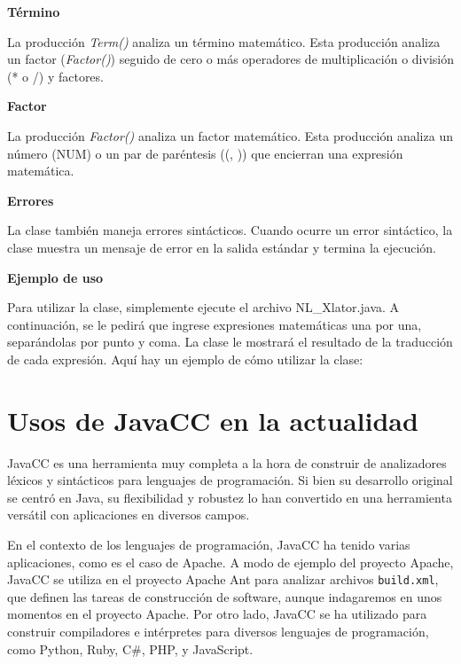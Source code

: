 \phantom{text}

\noindent \textbf{Término}

\phantom{text}

\noindent La producción \textit{Term()} analiza un término matemático. Esta producción analiza un factor (\textit{Factor()}) seguido de cero o más operadores de multiplicación o división (* o /) y factores.

\phantom{text}

\noindent \textbf{Factor}

\phantom{text}

\noindent La producción \textit{Factor()} analiza un factor matemático. Esta producción analiza un número (NUM) o un par de paréntesis ((, )) que encierran una expresión matemática.

\phantom{text}

\noindent \textbf{Errores}

\phantom{text}

\noindent La clase también maneja errores sintácticos. Cuando ocurre un error sintáctico, la clase muestra un mensaje de error en la salida estándar y termina la ejecución.

\phantom{text}

\noindent \textbf{Ejemplo de uso}

\phantom{text}

\noindent Para utilizar la clase, simplemente ejecute el archivo NL\_Xlator.java. A continuación, se le pedirá que ingrese expresiones matemáticas una por una, separándolas por punto y coma. La clase le mostrará el resultado de la traducción de cada expresión.
Aquí hay un ejemplo de cómo utilizar la clase:

\section{Usos de JavaCC en la actualidad}

\noindent JavaCC es una herramienta muy completa a la hora de construir de analizadores léxicos y sintácticos para lenguajes de programación. Si bien su desarrollo original se centró en Java, su flexibilidad y robustez lo han convertido en una herramienta versátil con aplicaciones en diversos campos.

En el contexto de los lenguajes de programación, JavaCC ha tenido varias aplicaciones, como es el caso de Apache. A modo de ejemplo del proyecto Apache, JavaCC se utiliza en el proyecto Apache Ant para analizar archivos  \lstinline|build.xml|, que definen las tareas de construcción de software\cite{apache}, aunque indagaremos en unos momentos en el proyecto Apache. Por otro lado, JavaCC se ha utilizado para construir compiladores e intérpretes para diversos lenguajes de programación, como Python, Ruby, C\#, PHP, y JavaScript\cite{javaccc++preprocessor}.

